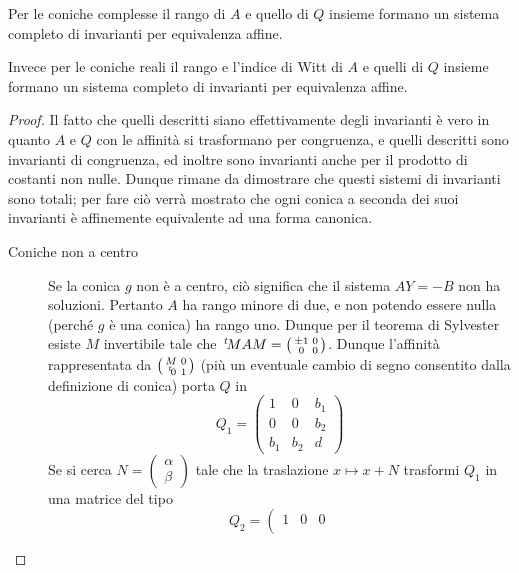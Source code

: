 \begin{theorem}
	 Per le coniche complesse il rango di $A$ e quello di $Q$ insieme formano un sistema completo di invarianti per equivalenza affine.
	 
	 Invece per le coniche reali il rango e l'indice di Witt di $A$ e quelli di $Q$ insieme formano un sistema completo di invarianti
	 per equivalenza affine.
\end{theorem}
\begin{proof}
 Il fatto che quelli descritti siano effettivamente degli invarianti è vero in quanto $A$ e $Q$ con le affinità si trasformano per congruenza,
 e quelli descritti sono invarianti di congruenza, ed inoltre sono invarianti anche per il prodotto di costanti non nulle.
 Dunque rimane da dimostrare che questi sistemi di invarianti sono totali; per fare ciò verrà mostrato che ogni conica a seconda dei suoi
 invarianti è affinemente equivalente ad una forma canonica.
 \begin{description}
  \item[Coniche non a centro] Se la conica $g$ non è a centro, ciò significa che il sistema $AY=-B$ non ha soluzioni. Pertanto $A$ ha
  rango minore di due, e non potendo essere nulla (perché $g$ è una conica) ha rango uno.
  Dunque per il teorema di Sylvester esiste $M$ invertibile tale che $\tra MAM=\left(\begin{smallmatrix}\pm1 & 0 \\ 0 & 0 \end{smallmatrix}
  \right)$. Dunque l'affinità rappresentata da $\left(\begin{smallmatrix}M & 0 \\ \tra 0 & 1 \end{smallmatrix} \right)$ (più un eventuale cambio
  di segno consentito dalla definizione di conica) porta $Q$ in $$Q_1=\left(
  \begin{array}{ccc}
   1 & 0 & b_1\\
   0 & 0 & b_2\\
   b_1 & b_2 & d
  \end{array}
  \right)$$
  Se si cerca $N=\left(\begin{smallmatrix}\alpha\\ \beta \end{smallmatrix} \right)$ tale che la traslazione $x\mapsto x+N$ trasformi $Q_1$ in
  una matrice del tipo $$Q_2=\left(
  \begin{array}{ccc}
   1 & 0 & 0\\

\end{array}$$
\end{description}
\end{proof}
